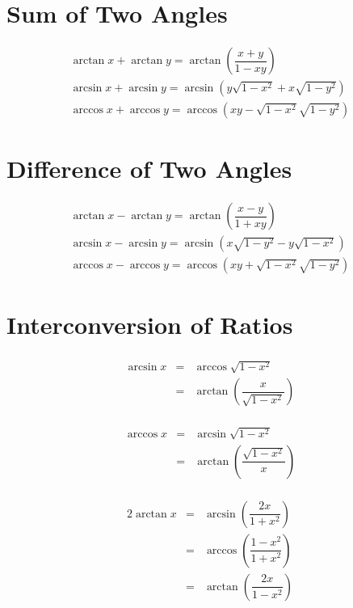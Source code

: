 \documentclass[openany, oneside]{book}
\begin{document}
\section{Sum of Two Angles}
\begin{align}
\arctan x+\arctan y=\arctan \left(\dfrac{x+y}{1-xy}\right)\\
\arcsin x+\arcsin y=\arcsin (y\sqrt{1-x^2}+x\sqrt{1-y^2})\\
\arccos x+\arccos y=\arccos (xy-\sqrt{1-x^2}\sqrt{1-y^2})
\end{align}

\section{Difference of Two Angles}
\begin{align}
\arctan x-\arctan y=\arctan \left(\dfrac{x-y}{1+xy}\right)\\
\arcsin x-\arcsin y=\arcsin (x\sqrt{1-y^2}-y\sqrt{1-x^2})\\
\arccos x-\arccos y=\arccos (xy+\sqrt{1-x^2}\sqrt{1-y^2})
\end{align}

\section{Interconversion of Ratios}
\begin{equation}
\begin{aligned}
\begin{split}
\arcsin x & = & \arccos \sqrt{1-x^2}\\
 & = & \arctan \left(\dfrac{x}{\sqrt{1-x^2}}\right)
\end{split}
\end{aligned}
\end{equation}

\begin{equation}
\begin{aligned}
\begin{split}
\arccos x & = & \arcsin \sqrt{1-x^2}\\
 & = & \arctan \left(\dfrac{\sqrt{1-x^2}}{x}\right)
\end{split}
\end{aligned}
\end{equation}

\begin{equation}
\begin{aligned}
\begin{split}
2\arctan x & = & \arcsin\left(\dfrac{2x}{1+x^2}\right)\\
 & = & \arccos \left(\dfrac{1-x^2}{1+x^2}\right)\\
 & = & \arctan \left(\dfrac{2x}{1-x^2}\right)
\end{split}
\end{aligned}
\end{equation}
\end{document}
